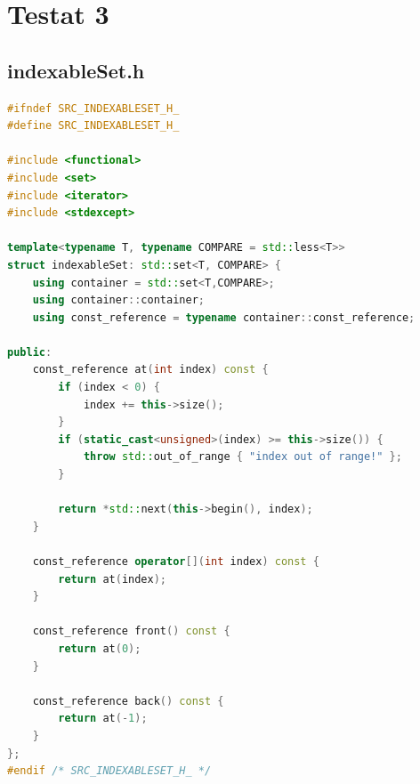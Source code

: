 \section{Testat 3}
\subsection{indexableSet.h}
\begin{lstlisting}[language=C++]
#ifndef SRC_INDEXABLESET_H_
#define SRC_INDEXABLESET_H_

#include <functional>
#include <set>
#include <iterator>
#include <stdexcept>

template<typename T, typename COMPARE = std::less<T>>
struct indexableSet: std::set<T, COMPARE> {
	using container = std::set<T,COMPARE>;
	using container::container;
	using const_reference = typename container::const_reference;

public:
	const_reference at(int index) const {
		if (index < 0) {
			index += this->size();
		}
		if (static_cast<unsigned>(index) >= this->size()) {
			throw std::out_of_range { "index out of range!" };
		}

		return *std::next(this->begin(), index);
	}

	const_reference operator[](int index) const {
		return at(index);
	}

	const_reference front() const {
		return at(0);
	}

	const_reference back() const {
		return at(-1);
	}
};
#endif /* SRC_INDEXABLESET_H_ */
\end{lstlisting}
